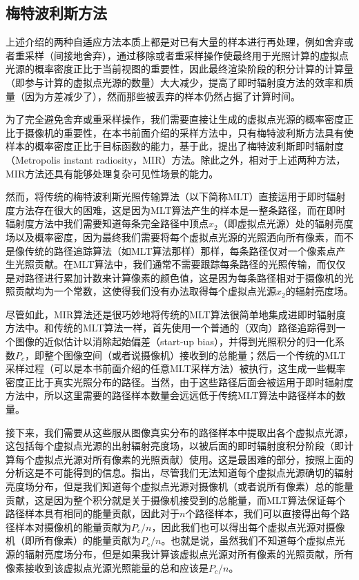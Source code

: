 \subsection{梅特波利斯方法}\label{sec:ir-mir}
上述介绍的两种自适应方法本质上都是对已有大量的样本进行再处理，例如舍弃或者重采样（间接地舍弃），通过移除或者重采样操作使最终用于光照计算的虚拟点光源的概率密度正比于当前视图的重要性，因此最终渲染阶段的积分计算的计算量（即参与计算的虚拟点光源的数量）大大减少，提高了即时辐射度方法的效率和质量（因为方差减少了），然而那些被丢弃的样本仍然占据了计算时间。

为了完全避免舍弃或重采样操作，我们需要直接让生成的虚拟点光源的概率密度正比于摄像机的重要性，在本书前面介绍的采样方法中，只有梅特波利斯方法具有使样本的概率密度正比于目标函数的能力，基于此，\cite{a:MetropolisInstantRadiosity}提出了梅特波利斯即时辐射度（Metropolis instant radiosity，MIR）方法。除此之外，相对于上述两种方法，MIR方法还具有能够处理复杂可见性场景的能力。

然而，将传统的梅特波利斯光照传输算法（以下简称MLT）直接运用于即时辐射度方法存在很大的困难，这是因为MLT算法产生的样本是一整条路径，而在即时辐射度方法中我们需要知道每条完全路径中顶点$x_2$（即虚拟点光源）处的辐射亮度场以及概率密度，因为最终我们需要将每个虚拟点光源的光照洒向所有像素，而不是像传统的路径追踪算法（如MLT算法那样）那样，每条路径仅对一个像素点产生光照贡献。在MLT算法中，我们通常不需要跟踪每条路径的光照传输，而仅仅是对路径进行累加计数来计算像素的颜色值，这是因为每条路径相对于摄像机的光照贡献均为一个常数，这使得我们没有办法取得每个虚拟点光源$x_2$的辐射亮度场。

尽管如此，MIR算法还是很巧妙地将传统的MLT算法很简单地集成进即时辐射度方法中。和传统的MLT算法一样，首先使用一个普通的（双向）路径追踪得到一个图像的近似估计以消除起始偏差（start-up bias），并得到光照积分的归一化系数$P_c$，即整个图像空间（或者说摄像机）接收到的总能量；然后一个传统的MLT采样过程（可以是本书前面介绍的任意MLT采样方法）被执行，这生成一些概率密度正比于真实光照分布的路径。当然，由于这些路径后面会被运用于即时辐射度方法中，所以这里需要的路径样本数量会远远低于传统MLT算法中路径样本的数量。

接下来，我们需要从这些服从图像真实分布的路径样本中提取出各个虚拟点光源，这包括每个虚拟点光源的出射辐射亮度场，以被后面的即时辐射度积分阶段（即计算每个虚拟点光源对所有像素的光照贡献）使用。这是最困难的部分，按照上面的分析这是不可能得到的信息。\cite{a:BidirectionalInstantRadiosity}指出，尽管我们无法知道每个虚拟点光源确切的辐射亮度场分布，但是我们知道每个虚拟点光源对摄像机（或者说所有像素）总的能量贡献，这是因为整个积分就是关于摄像机接受到的总能量，而MLT算法保证每个路径样本具有相同的能量贡献，因此对于$n$个路径样本，我们可以直接得出每个路径样本对摄像机的能量贡献为$P_c/n$，因此我们也可以得出每个虚拟点光源对摄像机（即所有像素）的能量贡献为$P_c/n$。也就是说，虽然我们不知道每个虚拟点光源的辐射亮度场分布，但是如果我计算该虚拟点光源对所有像素的光照贡献，所有像素接收到该虚拟点光源光照能量的总和应该是$P_c/n$。

